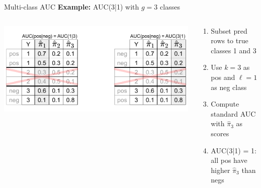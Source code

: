 \begin{vbframe}{Multi-class AUC}
\textbf{Example:} AUC(3|1) with $g=3$ classes 
\begin{columns}[T]
\begin{column}{0.3\textwidth}
\centerline{\includegraphics[trim = 250 15 00 10, clip, width=\textwidth]{figure_man/multiclass-auc.pdf}}
\end{column}
\begin{column}{0.7\textwidth}
    \lz
\begin{enumerate}
\item Subset pred rows to true classes 1 and 3
\item Use $k=3$ as pos and $\ell = 1$ as neg class
\item Compute standard AUC with $\hat{\pi}_3$ as scores\\ %
\item AUC(3|1) = 1:\\ all pos have higher $\hat{\pi}_3$ than negs
\end{enumerate}
\end{column}
\end{columns}

\end{vbframe}



